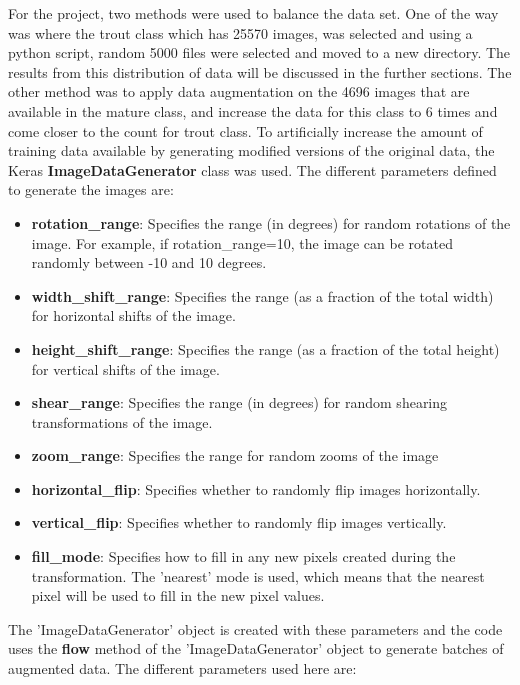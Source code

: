 For the project, two methods were used to balance the data set. One of the way was where the trout class which has 25570 images,  was selected and using a python script, random 5000 files were selected and moved to a new directory. The results from this distribution of data will be discussed in the further sections. The other method was to apply data augmentation on the 4696 images that are available in the mature class, and increase the data for this class to 6 times and come closer to the count for trout class. To artificially increase the amount of training data available by generating modified versions of the original data, the Keras \textbf{ImageDataGenerator} class was used. The different parameters defined to generate the images are:
\begin{itemize}
    \item \textbf{rotation\_range}: Specifies the range (in degrees) for random rotations of the image. For example, if rotation\_range=10, the image can be rotated randomly between -10 and 10 degrees.
    \item \textbf{width\_shift\_range}: Specifies the range (as a fraction of the total width) for horizontal shifts of the image.
    \item \textbf{height\_shift\_range}: Specifies the range (as a fraction of the total height) for vertical shifts of the image.
    \item \textbf{shear\_range}: Specifies the range (in degrees) for random shearing transformations of the image.
    \item \textbf{zoom\_range}: Specifies the range for random zooms of the image
    \item \textbf{horizontal\_flip}: Specifies whether to randomly flip images horizontally.
    \item \textbf{vertical\_flip}: Specifies whether to randomly flip images vertically.
    \item \textbf{fill\_mode}: Specifies how to fill in any new pixels created during the transformation. The 'nearest' mode is used, which means that the nearest pixel will be used to fill in the new pixel values.
\end{itemize}

The 'ImageDataGenerator' object is created with these parameters and the code uses the \textbf{flow} method \cite{tensorflowTfkeraspreprocessingimageImageDataGeneratorTensorFlow} of the 'ImageDataGenerator' object to generate batches of augmented data. The different parameters used here are:

